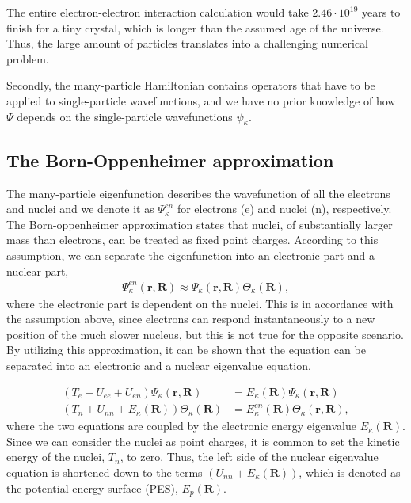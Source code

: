 The entire electron-electron interaction calculation would take $2.46 \cdot 10^{19}$ years to finish for a tiny crystal, which is longer than the assumed age of the universe. Thus, the large amount of particles translates into a challenging numerical problem.


Secondly, the many-particle Hamiltonian contains operators that have to be applied to single-particle wavefunctions, and we have no prior knowledge of how $\Psi$ depends on the single-particle wavefunctions $\psi_\kappa$.


\subsection{The Born-Oppenheimer approximation}
The many-particle eigenfunction describes the wavefunction of all the electrons and nuclei and we denote it as $\Psi_{\kappa}^{en}$ for electrons (e) and nuclei (n), respectively. The Born-oppenheimer approximation states that nuclei, of substantially larger mass than electrons, can be treated as fixed point charges. According to this assumption, we can separate the eigenfunction into an electronic part and a nuclear part,
\begin{align}
  \Psi_\kappa^{en}(\boldsymbol{r}, \boldsymbol{R}) \approx \Psi_{\kappa}(\boldsymbol{r}, \boldsymbol{R})\Theta_{\kappa}(\boldsymbol{R}),
\end{align}
where the electronic part is dependent on the nuclei. This is in accordance with the assumption above, since electrons can respond instantaneously to a new position of the much slower nucleus, but this is not true for the opposite scenario. By utilizing this approximation, it can be shown that the equation can be separated into an electronic and a nuclear eigenvalue equation,

\begin{align}
      \left( T_e + U_{ee} + U_{en} \right) \Psi_\kappa (\boldsymbol{r},\boldsymbol{R}) &= E_{\kappa}(\boldsymbol{R})\Psi_\kappa(\boldsymbol{r},\boldsymbol{R})\\
      \left(T_n + U_{nn} + E_\kappa (\boldsymbol{R}) \right) \Theta_\kappa(\boldsymbol{R}) &= E_{\kappa}^{en}(\boldsymbol{R})\Theta_\kappa(\boldsymbol{r},\boldsymbol{R}),
\end{align}
where the two equations are coupled by the electronic energy eigenvalue $E_{\kappa}(\boldsymbol{R})$. Since we can consider the nuclei as point charges, it is common to set the kinetic energy of the nuclei, $T_n$, to zero. Thus, the left side of the nuclear eigenvalue equation is shortened down to the terms $\left(U_{nn} + E_\kappa (\boldsymbol{R}) \right)$, which is denoted as the potential energy surface (PES), $E_p(\boldsymbol{R})$.


